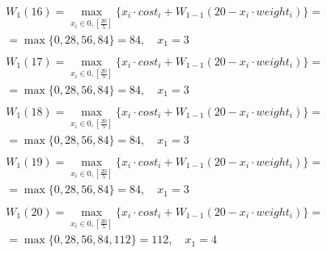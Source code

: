 \documentclass[17pt]{extarticle}
\begin{document}
\[
    \begin{aligned}
         & W_1(16)=\max_{x_i \in \overline{0, \left[\frac{20}{5}\right]}} \{x_i \cdot cost_i + W_{1-1}(20 - x_i \cdot weight_i)\}= \\& = \max \{
        0, 28, 56, 84\}= 84, \quad x_1 = 3                                                                                         \\
    \end{aligned}
\]
\[
    \begin{aligned}
         & W_1(17)=\max_{x_i \in \overline{0, \left[\frac{20}{5}\right]}} \{x_i \cdot cost_i + W_{1-1}(20 - x_i \cdot weight_i)\}= \\& = \max \{
        0, 28, 56, 84\}= 84, \quad x_1 = 3                                                                                         \\
    \end{aligned}
\]
\[
    \begin{aligned}
         & W_1(18)=\max_{x_i \in \overline{0, \left[\frac{20}{5}\right]}} \{x_i \cdot cost_i + W_{1-1}(20 - x_i \cdot weight_i)\}= \\& = \max \{
        0, 28, 56, 84\}= 84, \quad x_1 = 3                                                                                         \\
    \end{aligned}
\]
\[
    \begin{aligned}
         & W_1(19)=\max_{x_i \in \overline{0, \left[\frac{20}{5}\right]}} \{x_i \cdot cost_i + W_{1-1}(20 - x_i \cdot weight_i)\}= \\& = \max \{
        0, 28, 56, 84\}= 84, \quad x_1 = 3                                                                                         \\
    \end{aligned}
\]
\[
    \begin{aligned}
         & W_1(20)=\max_{x_i \in \overline{0, \left[\frac{20}{5}\right]}} \{x_i \cdot cost_i + W_{1-1}(20 - x_i \cdot weight_i)\}= \\& = \max \{
        0, 28, 56, 84, 112\}= 112, \quad x_1 = 4                                                                                   \\
    \end{aligned}
\]
\end{document}
